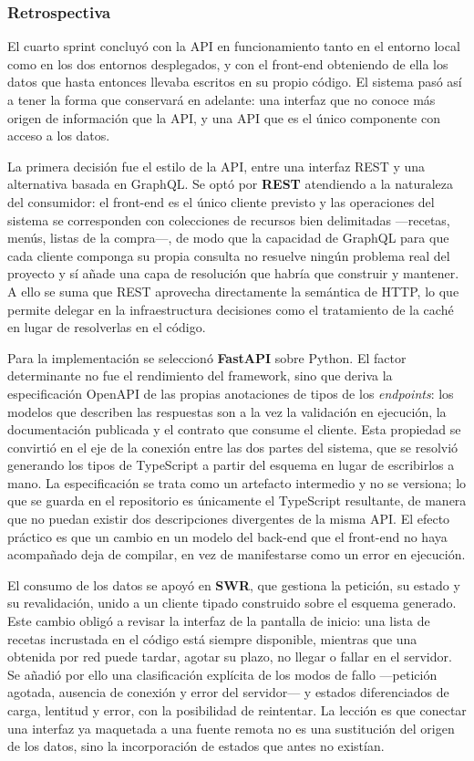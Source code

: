 \subsubsection*{Retrospectiva}

El cuarto sprint concluyó con la API en funcionamiento tanto en el entorno local
como en los dos entornos desplegados, y con el front-end obteniendo de ella los
datos que hasta entonces llevaba escritos en su propio código. El sistema pasó
así a tener la forma que conservará en adelante: una interfaz que no conoce más
origen de información que la API, y una API que es el único componente con
acceso a los datos.

La primera decisión fue el estilo de la API, entre una interfaz REST y una
alternativa basada en GraphQL. Se optó por \textbf{REST} atendiendo a la
naturaleza del consumidor: el front-end es el único cliente previsto y las
operaciones del sistema se corresponden con colecciones de recursos bien
delimitadas —recetas, menús, listas de la compra—, de modo que la capacidad de
GraphQL para que cada cliente componga su propia consulta no resuelve ningún
problema real del proyecto y sí añade una capa de resolución que habría que
construir y mantener. A ello se suma que REST aprovecha directamente la
semántica de HTTP, lo que permite delegar en la infraestructura decisiones como
el tratamiento de la caché en lugar de resolverlas en el código.

Para la implementación se seleccionó \textbf{FastAPI} sobre Python. El factor
determinante no fue el rendimiento del framework, sino que deriva la
especificación OpenAPI de las propias anotaciones de tipos de los
\textit{endpoints}: los modelos que describen las respuestas son a la vez la
validación en ejecución, la documentación publicada y el contrato que consume el
cliente. Esta propiedad se convirtió en el eje de la conexión entre las dos
partes del sistema, que se resolvió generando los tipos de TypeScript a partir
del esquema en lugar de escribirlos a mano. La especificación se trata como un
artefacto intermedio y no se versiona; lo que se guarda en el repositorio es
únicamente el TypeScript resultante, de manera que no puedan existir dos
descripciones divergentes de la misma API. El efecto práctico es que un cambio
en un modelo del back-end que el front-end no haya acompañado deja de compilar,
en vez de manifestarse como un error en ejecución.

El consumo de los datos se apoyó en \textbf{SWR}, que gestiona la petición, su
estado y su revalidación, unido a un cliente tipado construido sobre el esquema
generado. Este cambio obligó a revisar la interfaz de la pantalla de inicio: una
lista de recetas incrustada en el código está siempre disponible, mientras que
una obtenida por red puede tardar, agotar su plazo, no llegar o fallar en el
servidor. Se añadió por ello una clasificación explícita de los modos de fallo
—petición agotada, ausencia de conexión y error del servidor— y estados
diferenciados de carga, lentitud y error, con la posibilidad de reintentar. La
lección es que conectar una interfaz ya maquetada a una fuente remota no es una
sustitución del origen de los datos, sino la incorporación de estados que antes
no existían.

